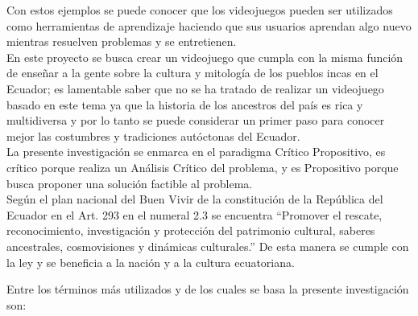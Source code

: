 \documentclass[a4paper, openright, 12pt]{report}
\begin{document}
Con estos ejemplos se puede conocer que los videojuegos pueden ser utilizados como herramientas de aprendizaje haciendo que sus usuarios aprendan algo nuevo mientras resuelven problemas y se entretienen.\\ 
En este proyecto se busca crear un videojuego que cumpla con la misma función de enseñar a la gente sobre la cultura y mitología de los pueblos incas en el Ecuador; es lamentable saber que no se ha tratado de realizar un videojuego basado en este tema ya que la historia de los ancestros del país es rica y multidiversa y por lo tanto se puede considerar un primer paso para conocer mejor las costumbres y tradiciones autóctonas del Ecuador.\\
La presente investigación se enmarca en el paradigma Crítico Propositivo, es crítico porque realiza un Análisis Crítico del problema, y es Propositivo porque busca proponer una solución factible al problema.\\
Según el plan nacional del Buen Vivir de la constitución de la República del Ecuador en el Art. 293 en el numeral 2.3 se encuentra “Promover el rescate, reconocimiento, investigación y protección del patrimonio cultural, saberes ancestrales, cosmovisiones y dinámicas culturales.” De esta manera se cumple con la ley y se beneficia a la nación y a la cultura ecuatoriana.

\justify
Entre los términos más utilizados y de los cuales se basa la presente investigación son:
\end{document}
